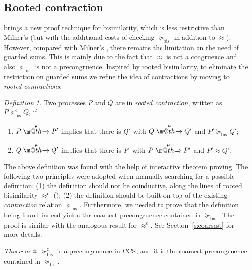\documentclass[GCNS]{yincog}
\makeatletter
\def \rightarrowfill{$\m@th\mathord{\smash-}\mkern-6mu%
  \cleaders\hbox{$\mkern-2mu\mathord{\smash-}\mkern-2mu$}\hfill
  \mkern-6mu\mathord\rightarrow$}
\def \rightarrowfillWEAK{$\m@th\mathord{\smash=}\mkern-6mu%
  \cleaders\hbox{$\mkern-2mu\mathord{\smash=}\mkern-2mu$}\hfill
  \mkern-6mu\mathord\Rightarrow$}
\theoremstyle{remark}
\newtheorem{definition}{Definition}[section]
\theoremstyle{theorem}
\newtheorem{theorem}[definition]{Theorem}
\theoremstyle{remark}
\newcommand{\arr}[1]{\mathrel{\stackrel{{\;\;#1\;\;}}{\mbox{\rightarrowfill}}}}
\newcommand{\Arr}[1]{\mathrel{\stackrel{{\;\;#1\;\;}}{\mbox{\rightarrowfillWEAK}}}}
\newcommand{\rapprox}{\mathrel{\approx^{\mathrm{c}}}}
\newcommand{\wbvtex}{\approx}
\newcommand{\mcontrBIS}{\mathrel{\succeq_{\mathrm{bis}}}}
\newcommand{\rcontr}{\mathrel{\succeq^{\mathrm{c}}_{\mathrm{bis}}}}
\makeatother
\begin{document}
\subsection{Rooted contraction}
 \label{ss:new}

 brings a new proof technique for bisimilarity,
which is less restrictive than Milner's  (but with
the additional costs of checking $\mcontrBIS $ in addition to
$\wbvtex $). However, compared with Milner's , there
remains the limitation on the need of guarded sums. This is mainly due
to the fact that $\wbvtex $ is not a congruence and also
$\mcontrBIS $ is not a precongruence. Inspired by rooted bisimilarity,
to eliminate the restriction on guarded sums we refine the idea of contractions
by moving to \emph{rooted contractions}:

\begin{definition}
 \label{d:rcontra}
Two processes $P$ and $Q$ are in \emph{rooted contraction}, written as
$P\rcontr Q$, if
%
\begin{enumerate}
%
\item $P \arr\mu P'$ implies that there is $Q'$ with $Q \arr \mu Q'$ and
$P'\mcontrBIS Q'$;
%
\item $Q \arr\mu Q'$ implies that there is $P'$ with $P \Arr \mu P'$ and
$P' \wbvtex Q'$.
%
\end{enumerate}
%
\end{definition}

The above definition was found with the help of interactive theorem proving.
The following two principles were adopted when manually searching for a
possible definition: (1) the definition should not be coinductive, along
the lines of rooted bisimilarity $\rapprox $ ();
(2) the definition should be built on top of the existing
\emph{contraction} relation $\mcontrBIS $. Furthermore, we needed to prove
that the definition being found indeed yields the coarsest precongruence
contained in $\mcontrBIS $. The proof is similar with the analogous result
for $\rapprox $. See Section~\ref{s:coarsest} for more details.

\begin{theorem}
 \label{t:rcontrPrecongruence}
$\rcontr $ is a precongruence in CCS, and it is the coarsest precongruence
contained in $\mcontrBIS $.
\end{theorem}
\end{document}
